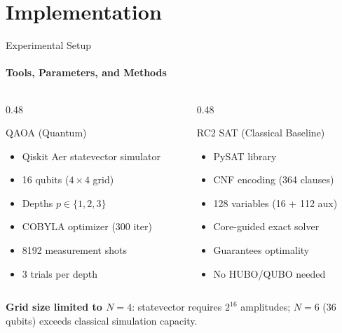 \documentclass[aspectratio=169, t]{beamer}
\begin{document}
\section{Implementation}

\begin{frame}{Experimental Setup}
\framesubtitle{Tools, Parameters, and Methods}

\begin{columns}
\begin{column}{0.48\textwidth}
\begin{block}{QAOA (Quantum)}
\begin{itemize}
    \item Qiskit Aer statevector simulator
    \item 16 qubits ($4\times4$ grid)
    \item Depths $p \in \{1, 2, 3\}$
    \item COBYLA optimizer (300 iter)
    \item 8192 measurement shots
    \item 3 trials per depth
\end{itemize}
\end{block}
\end{column}

\begin{column}{0.48\textwidth}
\begin{block}{RC2 SAT (Classical Baseline)}
\begin{itemize}
    \item PySAT library \cite{ignatiev2019rc2}
    \item CNF encoding (364 clauses)
    \item 128 variables (16 + 112 aux)
    \item Core-guided exact solver
    \item Guarantees optimality
    \item No HUBO/QUBO needed
\end{itemize}
\end{block}
\end{column}
\end{columns}

\bigskip
\textbf{Grid size limited to $N=4$}: statevector requires $2^{16}$ amplitudes; $N=6$ (36 qubits) exceeds classical simulation capacity.
\end{frame}

\end{document}

